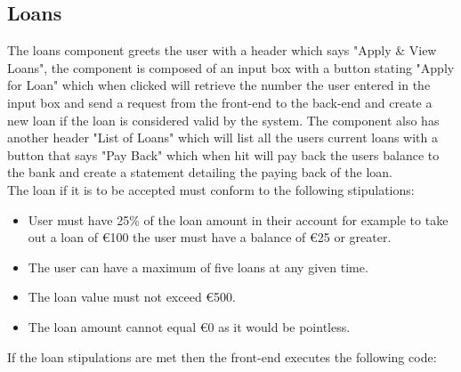 \subsection{Loans}
The loans component greets the user with a header which says "Apply \& View Loans", the component is composed of
an input box with a button stating "Apply for Loan" which when clicked will retrieve the number the user entered
in the input box and send a request from the front-end to the back-end and create a new loan if the loan is considered
valid by the system.  The component also has another header "List of Loans" which will list all the users current loans
with a button that says "Pay Back" which when hit will pay back the users balance to the bank and create a statement detailing
the paying back of the loan.
\\
The loan if it is to be accepted must conform to the following stipulations:
\begin{itemize}
  \item User must have 25\% of the loan amount in their account for example to take out a loan of €100 the user must have a balance of €25 or greater.
  \item The user can have a maximum of five loans at any given time.
  \item The loan value must not exceed €500.
  \item The loan amount cannot equal €0 as it would be pointless.
\end{itemize}
If the loan stipulations are met then the front-end executes the following code:
